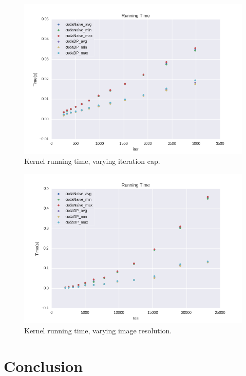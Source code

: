 \documentclass[letterpaper]{article}
\begin{document}
\begin{multicols}{2}
\begin{figure}[H]
  \includegraphics[width=\linewidth]{experiments1/running_time_graph_exp_iter.png}
  \caption{Kernel running time, varying iteration cap.}
  \label{fig:rt_iter}
\end{figure}

\begin{figure}[H]
  \includegraphics[width=\linewidth]{experiments1/running_time_graph_exp_res.png}
  \caption{Kernel running time, varying image resolution.}
  \label{fig:rt_res}
\end{figure}


  \section{Conclusion}
\end{multicols}
\end{document}
